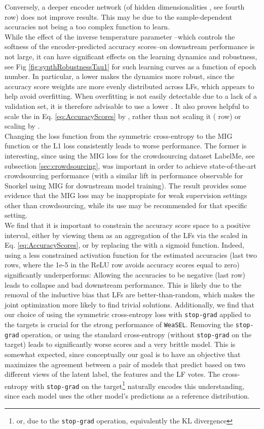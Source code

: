 \documentclass{article}
\newcommand{\weasel}{\texttt{WeaSEL}}\newcommand{\brackets}[1]{\left( #1 \right)}
\begin{document}
Conversely, a deeper encoder network (of hidden dimensionalities , see fourth row) does not improve results. This may be due to the sample-dependent accuracies not being a too complex function to learn.  
\\
While the effect of the inverse temperature parameter --which controls the softness of the encoder-predicted accuracy scores--on downstream performance is not large, it can have significant effects on the learning dynamics and robustness, see Fig \ref{fig:synthRobustnessTau1} for such learning curves as a function of epoch number. In particular, a lower  makes the dynamics more robust, since the accuracy score weights are more evenly distributed across LFs, which appears to help avoid overfitting. When overfitting is not easily detectable due to a lack of a validation set, it is therefore advisable to use a lower .
It also proves helpful to scale the  in Eq. \ref{eq:AccuracyScores} by , rather than not scaling it ( row) or scaling by .
\\
Changing the loss function from the symmetric cross-entropy to the MIG function \cite{MaxMIG} or the L1 loss consistently leads to worse performance. The former is interesting, since using the MIG loss for the crowdsourcing dataset LabelMe, see subsection \ref{sec:crowdsourcing}, was important in order to achieve state-of-the-art crowdsourcing performance (with a similar lift in performance observable for Snorkel using MIG for downstream model training).
The result provides some evidence that the MIG loss may be inappropiate for weak supervision settings other than crowdsourcing, while its use may be recommended for that specific setting.
\\
We find that it is important to constrain the accuracy score space to a positive interval, either by viewing them as an aggregation of the LFs via the scaled  in Eq. \ref{eq:AccuracyScores}, or by replacing the  with a sigmoid function. Indeed, using a less constrained activation function for the estimated accuracies (last two rows, where the 1e-5 in the ReLU row avoids accuracy scores equal to zero) significantly underperforms:
Allowing the accuracies to be negative (last row) leads to collapse and bad downstream performance. This is likely due to the removal of the inductive bias that LFs are better-than-random, which makes the joint optimization more likely to find trivial solutions.
Additionally, we find that our choice of using the symmetric cross-entropy loss with \texttt{stop-grad} applied to the targets is  crucial for the strong performance of \weasel. Removing the \texttt{stop-grad} operation, or using the standard cross-entropy (without \texttt{stop-grad} on the target) leads to significantly worse scores and a very brittle model. This is somewhat expected, since conceptually our goal is to have an objective that maximizes the agreement between a pair of models that predict based on two different views of the latent label, the features and the LF votes. The cross-entropy with \texttt{stop-grad} on the target\footnote{or, due to the \texttt{stop-grad} operation, equivalently the KL divergence} naturally encodes this understanding, since each model uses the other model's predictions as a reference distribution. 
\end{document}
